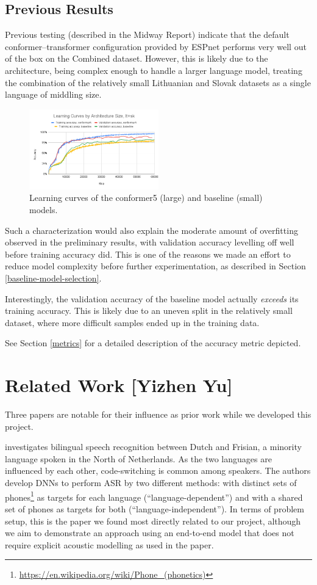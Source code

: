 \documentclass{article}
\begin{document}
  \subsection{Previous Results} \label{previous-results}
  Previous testing (described in the Midway Report) indicate that the default conformer--transformer configuration provided by ESPnet performs very well out of the box on the Combined dataset. However, this is likely due to the architecture, being complex enough to handle a larger language model, treating the combination of the relatively small Lithuanian and Slovak datasets as a single language of middling size.
  \begin{figure}
    \includegraphics[width=0.5\textwidth]{images/learning-architecture}
    \caption{Learning curves of the conformer5 (large) and baseline (small) models.}
  \end{figure}
  Such a characterization would also explain the moderate amount of overfitting observed in the preliminary results, with validation accuracy levelling off well before training accuracy did. This is one of the reasons we made an effort to reduce model complexity before further experimentation, as described in Section \ref{baseline-model-selection}.

  Interestingly, the validation accuracy of the baseline model actually \emph{exceeds} its training accuracy. This is likely due to an uneven split in the relatively small dataset, where more difficult samples ended up in the training data.

  See Section \ref{metrics} for a detailed description of the accuracy metric depicted.
  \section{Related Work [Yizhen Yu]} \label{related-work}
  Three papers are notable for their influence as prior work while we developed this project.

  \cite{Yilmaz} investigates bilingual speech recognition between Dutch and Frisian, a minority language spoken in the North of Netherlands. As the two languages are influenced by each other, code-switching is common among speakers. The authors develop DNNs to perform ASR by two different methods: with distinct sets of phones\footnote{\url{https://en.wikipedia.org/wiki/Phone_(phonetics)}} as targets for each language (``language-dependent'') and with a shared set of phones as targets for both (``language-independent''). In terms of problem setup, this is the paper we found most directly related to our project, although we aim to demonstrate an approach using an end-to-end model that does not require explicit acoustic modelling as used in the paper.
\end{document}

